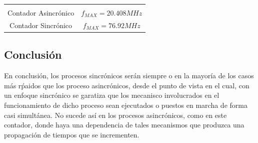 \begin{table}[H]
    \centering
    \begin{tabular}{c c}
        \hline \\
        Contador Asincr\'onico & $f_{MAX} = 20.408MHz$ \\
        Contador Sincr\'onico & $f_{MAX} = 76.92MHz$ \\
        \hline
    \end{tabular}
\end{table}

\subsection{Conclusi\'on}
En conclusi\'on, los procesos sincr\'onicos ser\'an siempre o en la mayor\'ia de los casos m\'as r\'paidos que los proceso asincr\'onicos,
desde el punto de vista en el cual, con un enfoque sincr\'onico se garatiza que los mecanisco involucrados en el funcionamiento de dicho proceso
sean ejecutados o puestos en marcha de forma casi simult\'anea. No sucede as\'i en los procesos asincr\'onicos, como en este contador, donde haya 
una dependencia de tales mecanismos que produzca una propagaci\'on de tiempos que se incrementen.
